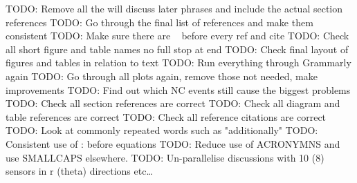 TODO: Remove all the will discuss later phrases and include the actual section references
TODO: Go through the final list of references and make them consistent
TODO: Make sure there are ~ before every ref and cite
TODO: Check all short figure and table names no full stop at end
TODO: Check final layout of figures and tables in relation to text
TODO: Run everything through Grammarly again
TODO: Go through all plots again, remove those not needed, make improvements
TODO: Find out which NC events still cause the biggest problems
TODO: Check all section references are correct
TODO: Check all diagram and table references are correct
TODO: Check all reference citations are correct
TODO: Look at commonly repeated words such as "additionally"
TODO: Consistent use of : before equations
TODO: Reduce use of ACRONYMNS and use \textsc{SMALLCAPS} elsewhere.
TODO: Un-parallelise discussions with 10 (8) sensors in r (theta) directions etc\dots